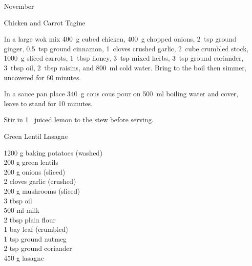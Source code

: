 \begin{menu}{November}
\begin{recipe}{2}{Chicken and Carrot Tagine}
\begin{ingredients}
		\end{ingredients}
	
	
    \begin{instructions}
    \item 
        In a large wok mix
        400~g cubed chicken,
        400~g chopped onions,
        2~tsp  ground ginger,
        0.5~tsp  ground cinnamon,
        1~cloves crushed garlic,
        2~cube crumbled stock,
        1000~g sliced carrots,
        1~tbsp  honey,
        3~tsp  mixed herbs,
        3~tsp  ground coriander,
        3~tbsp  oil,
        2~tbsp  raisins,
        and
        800~ml  cold water.
        Bring to the boil
        then simmer, uncovered for 60 minutes.
      \item 
    In a
    sauce pan
    place
    340~g  cous cous
    pour on
    500~ml  boiling water
    and cover, leave to stand for 10 minutes.
  \item 
        Stir in
        1~ juiced lemon
        to the stew
        before serving.
      
    \end{instructions}
    \end{recipe}%
  
    \begin{recipe}{2}{Green Lentil Lasagne}%
		\begin{ingredients}
		1200 g baking potatoes (washed) \\
	200 g green lentils  \\
	200 g onions (sliced) \\
	2 cloves garlic (crushed) \\
	200 g mushrooms (sliced) \\
	3 tbsp oil  \\
	500 ml milk  \\
	2 tbsp plain flour  \\
	1  bay leaf (crumbled) \\
	1 tsp ground nutmeg  \\
	2 tsp ground coriander  \\
	450 g lasagne  \\
	
		\end{ingredients}
	
	

\end{recipe}
\end{menu}
